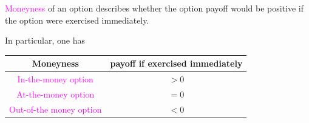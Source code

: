 \begin{frame}[fragile,t]
	\begin{mydefinition}
		\textcolor{magenta}{Moneyness} of an option describes whether the option payoff would be
		positive if the option were exercised immediately.
		\bigskip

		In particular, one has
		\bigskip

		\begin{center}
			\renewcommand{\arraystretch}{1.2}
			\begin{tabular}{|c|c|}
				\hline
				Moneyness                                    & payoff if exercised immediately \\ \hline
				\textcolor{magenta}{In-the-money option}     & $>0$                            \\
				\textcolor{magenta}{At-the-money option}     & $=0$                            \\
				\textcolor{magenta}{Out-of-the money option} & $<0$                            \\ \hline
			\end{tabular}
		\end{center}
	\end{mydefinition}
\end{frame}
